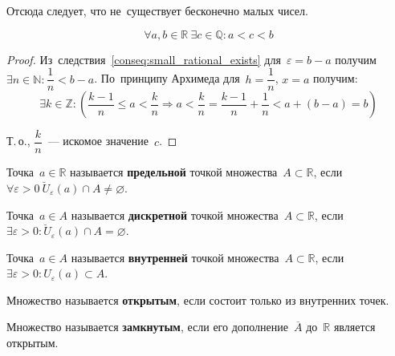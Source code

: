 Отсюда следует, что не~существует бесконечно малых чисел.

\begin{consequent}
\begin{equation*}
\forall a, b \in \mathbb R \ \exists c \in \mathbb Q \colon a < c < b
\end{equation*}
\end{consequent}
\begin{proof}
Из~следствия~\ref{conseq:small_rational_exists} для~$\varepsilon = b - a$ получим $\exists n \in \mathbb N \colon \dfrac1n < b - a$.
По~принципу Архимеда для~$h = \dfrac1n$, $x = a$ получим:
\begin{equation*}
\exists k \in \mathbb Z \colon \left( \frac{k - 1}n \leqslant a < \frac{k}n \Rightarrow
a < \frac{k}n = \frac{k - 1}n + \frac1n < a + (b - a) = b \right)
\end{equation*}

Т.\,о., $\dfrac{k}n$~--- искомое значение~$c$.
\end{proof}

\hypertarget{def:limit_point}{} Точка~$a \in \mathbb R$ называется \textbf{предельной} точкой множества~$A \subset \mathbb R$, если $\forall \varepsilon > 0 \ \breve U_\varepsilon(a) \cap A \neq \varnothing$.

\hypertarget{def:discrete_point}{} Точка~$a \in A$ называется \textbf{дискретной} точкой множества~$A \subset \mathbb R$, если $\exists \varepsilon > 0 \colon \breve U_\varepsilon(a) \cap A = \varnothing$.

\hypertarget{def:interior_point}{} Точка~$a \in A$ называется \textbf{внутренней} точкой множества~$A \subset \mathbb R$, если $\exists \varepsilon > 0 \colon U_\varepsilon(a) \subset A$.

Множество называется \textbf{открытым}, если состоит только из внутренних точек.

Множество называется \textbf{замкнутым}, если его дополнение~$\overline A$ до~$\mathbb R$ является открытым.

